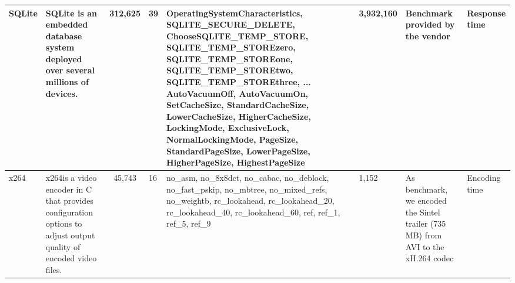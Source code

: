 \documentclass[smallextended]{svjour3}       %
\begin{document}
\begin{table}[tbh]
{\begin{tabular}{|p{1.05cm}|p{1.5cm}|c|p{0.35cm}|p{4cm}|p{.8cm}|p{2cm}|p{1cm}|}
SQLite                                                                    & SQLite is an embedded database system deployed over several millions of devices.                                 & 312,625 & 39       & OperatingSystemCharacteristics, SQLITE\_SECURE\_DELETE, ChooseSQLITE\_TEMP\_STORE, SQLITE\_TEMP\_STOREzero, SQLITE\_TEMP\_STOREone, SQLITE\_TEMP\_STOREtwo, SQLITE\_TEMP\_STOREthree, ... AutoVacuumOff, AutoVacuumOn, SetCacheSize, StandardCacheSize, LowerCacheSize, HigherCacheSize, LockingMode, ExclusiveLock, NormalLockingMode, PageSize, StandardPageSize, LowerPageSize, HigherPageSize, HighestPageSize & 3,932,160         & Benchmark provided by the vendor                                                                                                                           & Response time                                                \\ \hline
x264                                                                      & x264is a video encoder in C that provides configuration options to adjust output quality of encoded video files. & 45,743  & 16       & no\_asm, no\_8x8dct, no\_cabac, no\_deblock, no\_fast\_pskip, no\_mbtree, no\_mixed\_refs, no\_weightb, rc\_lookahead, rc\_lookahead\_20, rc\_lookahead\_40, rc\_lookahead\_60, ref, ref\_1, ref\_5, ref\_9                                                                                                                                                                                                                                                                                                                                                                                                                                                                                                                                                                                                                                                             & 1,152             & As benchmark, we encoded the Sintel trailer (735 MB) from AVI to the xH.264 codec                                                                          & Encoding time                                                \\ \hline
\end{tabular}

}

\label{fig:systems}
\end{table}
\end{document}
